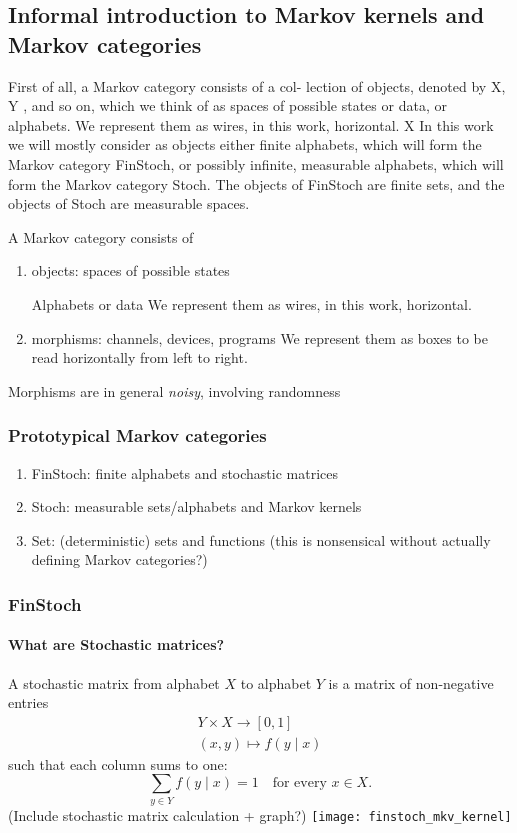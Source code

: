 \subsection{Informal introduction to Markov kernels and Markov categories}

\begin{frame}
First of all, a Markov category consists of a col- lection of objects, denoted by X, Y , and so on, which we think of as spaces of possible states or data, or alphabets. We represent them as wires, in this work, horizontal.  X In this work we will mostly consider as objects either finite alphabets, which will form the Markov category FinStoch, or possibly infinite, measurable alphabets, which will form the Markov category Stoch. The objects of FinStoch are finite sets, and the objects of Stoch are measurable spaces.
\end{frame}

\begin{frame}
    A Markov category consists of
    \begin{enumerate}
        \item objects: spaces of possible states\par
            Alphabets or data
            We represent them as wires, in this work, horizontal.
        \item morphisms: channels, devices, programs
            We represent them as boxes to be read horizontally from left to right.
    \end{enumerate}
    Morphisms are in general \emph{noisy}, involving randomness
\end{frame}

\begin{frame}
    \frametitle{Prototypical Markov categories}
    \begin{enumerate}
        \item FinStoch: finite alphabets and stochastic matrices
        \item Stoch: measurable sets/alphabets and Markov kernels
        \item Set: (deterministic) sets and functions (this is nonsensical without actually defining Markov categories?)
    \end{enumerate}
\end{frame}

\begin{frame}
    \frametitle{FinStoch}
    \framesubtitle{What are Stochastic matrices?}
    A stochastic matrix from alphabet $X$ to alphabet $Y$ is a matrix of non-negative entries
    \begin{align*}
        Y\times X \to [0,1]\\
        (x, y) \mapsto f(y\mid x)
    \end{align*}
    such that each column sums to one:
    \[
        \sum_{y\in Y} f(y\mid x) = 1 \quad \text{for every $x\in X$.}
    \]
    (Include stochastic matrix calculation + graph?)
    \texttt{[image: finstoch\_mkv\_kernel]}
\end{frame}

